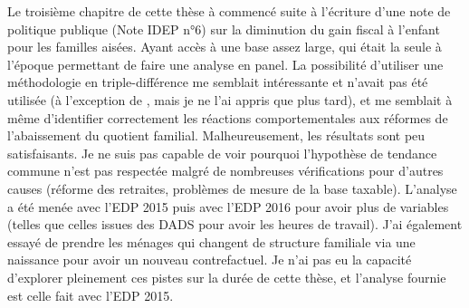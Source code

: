 Le troisième chapitre de cette thèse à commencé suite à l'écriture d'une note de politique publique (Note IDEP n°6) sur la diminution du gain fiscal à l'enfant pour les familles aisées. Ayant accès à une base assez large, qui était la seule à l'époque permettant de faire une analyse en panel. La possibilité d'utiliser une méthodologie en triple-différence me semblait intéressante et n'avait pas été utilisée (à l'exception de \citet{piketty1999hauts}, mais je ne l'ai appris que plus tard), et me semblait à même d'identifier correctement les réactions comportementales aux réformes de l'abaissement du quotient familial. Malheureusement, les résultats sont peu satisfaisants. Je ne suis pas capable de voir pourquoi l'hypothèse de tendance commune n'est pas respectée malgré de nombreuses vérifications pour d'autres causes (réforme des retraites, problèmes de mesure de la base taxable). L'analyse a été menée avec l'EDP 2015 puis avec l'EDP 2016 pour avoir plus de variables (telles que celles issues des DADS pour avoir les heures de travail). J'ai également essayé de prendre les ménages qui changent de structure familiale via une naissance pour avoir un nouveau contrefactuel. Je n'ai pas eu la capacité  d'explorer pleinement ces pistes sur la durée de cette thèse, et l'analyse fournie est celle fait avec l'EDP 2015. 





















\ifx\isEmbedded\undefined
\newpage
% 
% 

\else \fi
